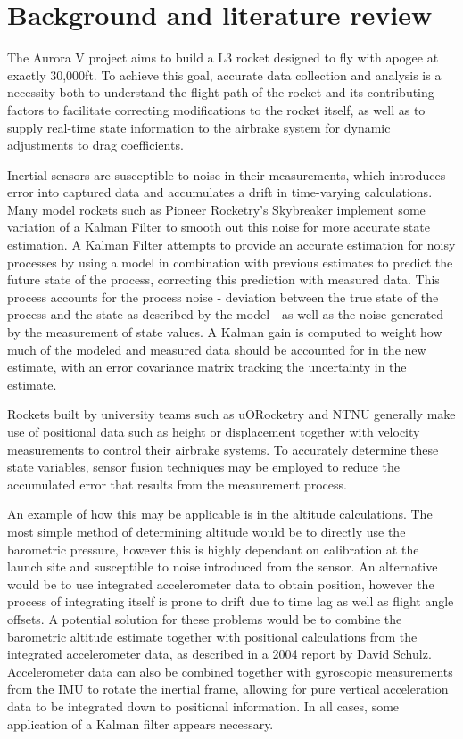 \section{Background and literature review}
The Aurora V project aims to build a L3 rocket designed to fly with apogee at exactly 30,000ft. To achieve this goal, accurate data collection and analysis is a necessity both to understand the flight path of the rocket and its contributing factors to facilitate correcting modifications to the rocket itself, as well as to supply real-time state information to the airbrake system for dynamic adjustments to drag coefficients.

Inertial sensors are susceptible to noise in their measurements, which introduces error into captured data and accumulates a drift in time-varying calculations. Many model rockets such as Pioneer Rocketry's Skybreaker\cite{pioneer-rocketry} implement some variation of a Kalman Filter to smooth out this noise for more accurate state estimation. A Kalman Filter attempts to provide an accurate estimation for noisy processes by using a model in combination with previous estimates to predict the future state of the process, correcting this prediction with measured data\cite{kalman-introduction,kalman1960}. This process accounts for the process noise - deviation between the true state of the process and the state as described by the model - as well as the noise generated by the measurement of state values. A Kalman gain is computed to weight how much of the modeled and measured data should be accounted for in the new estimate, with an error covariance matrix tracking the uncertainty in the estimate.

Rockets built by university teams such as uORocketry and NTNU generally make use of positional data such as height or displacement together with velocity measurements to control their airbrake systems\cite{uORocketry, NTNU}. To accurately determine these state variables, sensor fusion techniques may be employed to reduce the accumulated error that results from the measurement process. 

An example of how this may be applicable is in the altitude calculations. The most simple method of determining altitude would be to directly use the barometric pressure, however this is highly dependant on calibration at the launch site and susceptible to noise introduced from the sensor. An alternative would be to use integrated accelerometer data to obtain position, however the process of integrating itself is prone to drift due to time lag as well as flight angle offsets. A potential solution for these problems would be to combine the barometric altitude estimate together with positional calculations from the integrated accelerometer data, as described in a 2004 report by David Schulz\cite{kalman-apogee}. Accelerometer data can also be combined together with gyroscopic measurements from the IMU to rotate the inertial frame, allowing for pure vertical acceleration data to be integrated down to positional information. In all cases, some application of a Kalman filter appears necessary.


